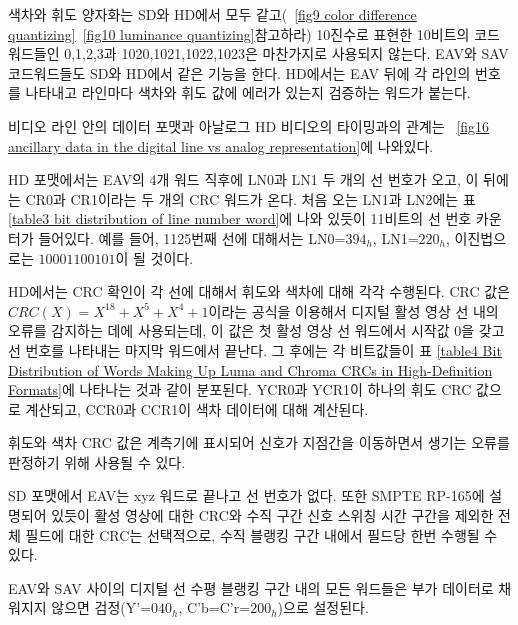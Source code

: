 색차와 휘도 양자화는 SD와 HD에서 모두 같고(\figurename~\ref{fig9 color difference quantizing}\와 \figurename~\ref{fig10 luminance quantizing}\을 참고하라) 10진수로 표현한 10비트의 코드워드들인 0,1,2,3과 1020,1021,1022,1023은 마찬가지로 사용되지 않는다.
EAV와 SAV 코드워드들도 SD와 HD에서 같은 기능을 한다. HD에서는 EAV 뒤에 각 라인의 번호를 나타내고 라인마다 색차와 휘도 값에 에러가 있는지 검증하는 워드가 붙는다.

비디오 라인 안의 데이터 포맷과 아날로그 HD 비디오의 타이밍과의 관계는 \figurename~\ref{fig16 ancillary data in the digital line vs analog representation}에 나와있다.

HD 포맷에서는 EAV의 4개 워드 직후에 LN0과 LN1 두 개의 선 번호가 오고, 이 뒤에는 CR0과 CR1이라는 두 개의 CRC 워드가 온다. 처음 오는 LN1과 LN2에는 표 \ref{table3 bit distribution of line number word}에 나와 있듯이 11비트의 선 번호 카운터가 들어있다.
예를 들어, 1125번째 선에 대해서는 LN0=$394_h$, LN1=$220_h$, 이진법으로는 $10001100101$이 될 것이다.

HD에서는 CRC 확인이 각 선에 대해서 휘도와 색차에 대해 각각 수행된다. CRC 값은 $CRC(X)=X^{18}+X^5+X^4+1$이라는 공식을 이용해서 디지털 활성 영상 선 내의 오류를 감지하는 데에 사용되는데, 이 값은 첫 활성 영상 선 워드에서 시작값 0을 갖고 선 번호를 나타내는 마지막 워드에서 끝난다.
그 후에는 각 비트값들이 표 \ref{table4 Bit Distribution of Words Making Up Luma and Chroma CRCs in High-Definition Formats}에 나타나는 것과 같이 분포된다. YCR0과 YCR1이 하나의 휘도 CRC 값으로 계산되고, CCR0과 CCR1이 색차 데이터에 대해 계산된다.

휘도와 색차 CRC 값은 계측기에 표시되어 신호가 지점간을 이동하면서 생기는 오류를 판정하기 위해 사용될 수 있다.

SD 포맷에서 EAV는 xyz 워드로 끝나고 선 번호가 없다. 또한 SMPTE RP-165에 설명되어 있듯이 활성 영상에 대한 CRC와 수직 구간 신호 스위칭 시간 구간을 제외한 전체 필드에 대한 CRC는 선택적으로, 수직 블랭킹 구간 내에서 필드당 한번 수행될 수 있다.

EAV와 SAV 사이의 디지털 선 수평 블랭킹 구간 내의 모든 워드들은 부가 데이터로 채워지지 않으면 검정(Y'=$040_h$, C'b=C'r=$200_h$)으로 설정된다.

